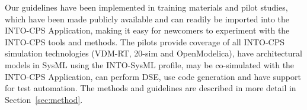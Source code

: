 Our guidelines have been implemented in training materials and pilot studies, which have been made publicly available and can readily be imported into the INTO-CPS Application, making it easy for newcomers to experiment with the INTO-CPS tools and methods. The pilots provide coverage of all INTO-CPS simulation technologies (VDM-RT, 20-sim and OpenModelica), have architectural models in SysML using the INTO-SysML profile, may be co-simulated with the INTO-CPS Application, can perform DSE, use code generation and have support for test automation. The methods and guidelines are described in more detail in Section~\ref{sec:method}.
